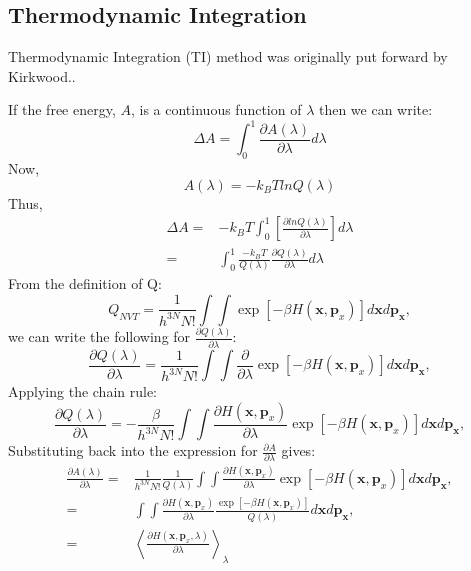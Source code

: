 \subsection{Thermodynamic Integration\label{Sec:FEM:TI}}
Thermodynamic Integration (TI) method was originally put forward by Kirkwood.\cite{KirkwoodJCP1935}. 
	
If the free energy, $A$, is a continuous function of $\lambda$ then we can write:
\begin{equation}
\Delta A = \int_{0}^{1} \frac{\partial{A(\lambda)}}{\partial{\lambda}} d\lambda
\label{Eq:deltaA1TI}
\end{equation} 
Now,
\begin{equation}
A(\lambda) = -k_{B}TlnQ(\lambda)
\label{Eq:Alambda}
\end{equation} 
Thus,
\begin{align}
\Delta A =& -k_{B}T\int_{0}^{1} [ \frac{\partial{lnQ(\lambda)}}{\partial{\lambda}} ]d\lambda \\
=&\int_{0}^{1}\frac{-k_{B}T}{Q(\lambda)}\frac{\partial{Q(\lambda)}}{\partial{\lambda}}d\lambda
\label{Eq:deltaA2TI}
\end{align} 
From the definition of Q:
\begin{equation}
Q_{NVT} = \frac{1}{{h}^{3N}N!} \int\int \exp[-\beta H(\textbf{x},\textbf{p}_{x})] d\textbf{x}d\textbf{p}_\textbf{x},
\label{Eq:PFTI}
\end{equation}
we can write the following for $\frac{\partial{Q(\lambda)}}{\partial{\lambda}}$:
\begin{equation}
\frac{\partial{Q(\lambda)}}{\partial{\lambda}} = \frac{1}{{h}^{3N}N!} \int\int \frac{\partial}{\partial{\lambda}}\exp[-\beta H(\textbf{x},\textbf{p}_{x})] d\textbf{x}d\textbf{p}_\textbf{x},
\label{Eq:PPF}
\end{equation}
Applying the chain rule:
\begin{equation}
\frac{\partial{Q(\lambda)}}{\partial{\lambda}} = -\frac{\beta}{{h}^{3N}N!} \int\int \frac{\partial{H(\textbf{x},\textbf{p}_{x})}}{\partial{\lambda}}\exp[-\beta H(\textbf{x},\textbf{p}_{x})] d\textbf{x}d\textbf{p}_\textbf{x},
\label{Eq:PPF2}
\end{equation}
Substituting back into the expression for $\frac{\partial{A}}{\partial{\lambda}}$ gives:
\begin{align}
\frac{\partial{A(\lambda)}}{\partial{\lambda}} =& \frac{1}{{h}^{3N}N!}\frac{1}{Q(\lambda)} \int\int \frac{\partial{H(\textbf{x},\textbf{p}_{x})}}{\partial{\lambda}}\exp[-\beta H(\textbf{x},\textbf{p}_{x})] d\textbf{x}d\textbf{p}_\textbf{x}, \\
=& \int\int \frac{\partial{H(\textbf{x},\textbf{p}_{x})}}{\partial{\lambda}}\frac{\exp[-\beta H(\textbf{x},\textbf{p}_{x})]}{Q(\lambda)} d\textbf{x}d\textbf{p}_\textbf{x}, \\
=& \left \langle \frac{\partial{H(\textbf{x},\textbf{p}_{x}, \lambda)}}{\partial{\lambda}} \right \rangle_{\lambda}
\label{Eq:PA2}
\end{align}

